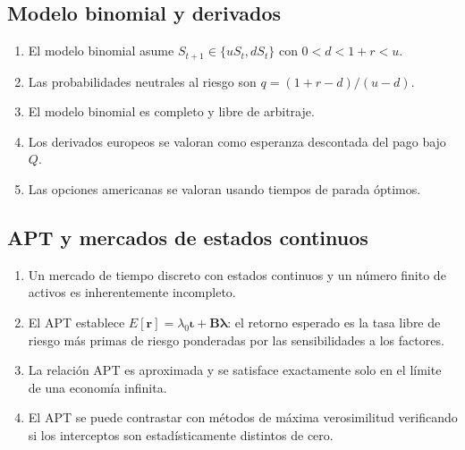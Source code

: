\documentclass[12pt]{article}
\begin{document}
\subsection{Modelo binomial y derivados}

\begin{enumerate}
    \item El modelo binomial asume $S_{t+1} \in \{uS_t, dS_t\}$ con $0 < d < 1 + r < u$.
    \item Las probabilidades neutrales al riesgo son $q = (1+r-d)/(u-d)$.
    \item El modelo binomial es completo y libre de arbitraje.
    \item Los derivados europeos se valoran como esperanza descontada del pago bajo $Q$.
    \item Las opciones americanas se valoran usando tiempos de parada \'optimos.
\end{enumerate}

\subsection{APT y mercados de estados continuos}

\begin{enumerate}
    \item Un mercado de tiempo discreto con estados continuos y un n\'umero finito de activos es inherentemente incompleto.
    \item El APT establece $E[\mathbf{r}] = \lambda_0\boldsymbol{\iota} + \mathbf{B}\boldsymbol{\lambda}$: el retorno esperado es la tasa libre de riesgo m\'as primas de riesgo ponderadas por las sensibilidades a los factores.
    \item La relaci\'on APT es aproximada y se satisface exactamente solo en el l\'imite de una econom\'ia infinita.
    \item El APT se puede contrastar con m\'etodos de m\'axima verosimilitud verificando si los interceptos son estad\'isticamente distintos de cero.
\end{enumerate}
\end{document}
